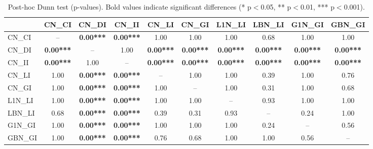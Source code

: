 \begin{table}[ht]
\centering
\begin{tabular}{lccccccccc}
\toprule
 & CN_CI & CN_DI & CN_II & CN_LI & CN_GI & L1N_LI & LBN_LI & G1N_GI & GBN_GI \\
\midrule
CN_CI & -- & \textbf{0.00***} & \textbf{0.00***} & 1.00 & 1.00 & 1.00 & 0.68 & 1.00 & 1.00 \\
CN_DI & \textbf{0.00***} & -- & 1.00 & \textbf{0.00***} & \textbf{0.00***} & \textbf{0.00***} & \textbf{0.00***} & \textbf{0.00***} & \textbf{0.00***} \\
CN_II & \textbf{0.00***} & 1.00 & -- & \textbf{0.00***} & \textbf{0.00***} & \textbf{0.00***} & \textbf{0.00***} & \textbf{0.00***} & \textbf{0.00***} \\
CN_LI & 1.00 & \textbf{0.00***} & \textbf{0.00***} & -- & 1.00 & 1.00 & 0.39 & 1.00 & 0.76 \\
CN_GI & 1.00 & \textbf{0.00***} & \textbf{0.00***} & 1.00 & -- & 1.00 & 0.31 & 1.00 & 0.68 \\
L1N_LI & 1.00 & \textbf{0.00***} & \textbf{0.00***} & 1.00 & 1.00 & -- & 0.93 & 1.00 & 1.00 \\
LBN_LI & 0.68 & \textbf{0.00***} & \textbf{0.00***} & 0.39 & 0.31 & 0.93 & -- & 0.24 & 1.00 \\
G1N_GI & 1.00 & \textbf{0.00***} & \textbf{0.00***} & 1.00 & 1.00 & 1.00 & 0.24 & -- & 0.56 \\
GBN_GI & 1.00 & \textbf{0.00***} & \textbf{0.00***} & 0.76 & 0.68 & 1.00 & 1.00 & 0.56 & -- \\
\bottomrule
\end{tabular}
\caption{Post-hoc Dunn test (p-values). Bold values indicate significant differences (* p$<$0.05, ** p$<$0.01, *** p$<$0.001).}
\label{tab:dunn_posthoc}
\end{table}